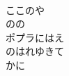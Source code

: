\documentclass[10pt,b5j]{tarticle} %
\begin{document}
\begin{enumerate}
\begin{minipage}[c]{\blocksize}
    \end{minipage}
    \begin{minipage}[c]{\blocksize}
        
        \vspace{\linespace}
        \item~\\
        ここのや\\
        のの\\
        ポプラにはえ\\
        のはれゆきて\\
        かに
    
    \end{minipage}
\end{enumerate} %
\end{document}
